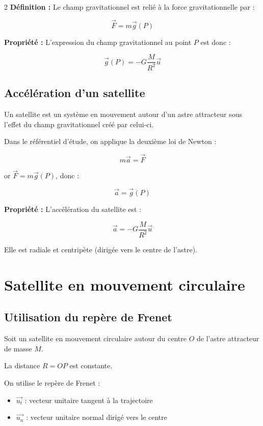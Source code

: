 \documentclass[11pt,a4paper]{article}
\newcommand{\defi}{\textbf{Définition :} }
\newcommand{\prop}{\textbf{Propriété :} }
\begin{document}
\begin{paracol}{2}
\defi Le champ gravitationnel est relié à la force gravitationnelle par :

\[
\vec{F}=m\vec{g}(P)
\]


\prop L'expression du champ gravitationnel au point $P$ est donc :

\[
\boxed{\vec{g}(P)=-G\frac{M}{R^2}\vec{u}}
\]

\subsection{Accélération d'un satellite}

Un satellite est un système en mouvement autour d'un astre attracteur sous l'effet du champ gravitationnel créé par celui-ci.

Dans le référentiel d'étude, on applique la deuxième loi de Newton :

\[
m\vec{a}=\vec{F}
\]

or $\vec{F}=m\vec{g}(P)$, donc :

\[
\vec{a}=\vec{g}(P)
\]

\prop L'accélération du satellite est :

\[
\boxed{\vec{a}=-G\frac{M}{R^2}\vec{u}}
\]

Elle est radiale et centripète (dirigée vers le centre de l'astre).


\switchcolumn
\setcounter{section}{1}

\section{Satellite en mouvement circulaire}

\subsection{Utilisation du repère de Frenet}

Soit un satellite en mouvement circulaire autour du centre $O$ de l'astre attracteur de masse $M$.

La distance $R=OP$ est constante.

On utilise le repère de Frenet :

\begin{itemize}
\item $\vec{u_t}$ : vecteur unitaire tangent à la trajectoire
\item $\vec{u_n}$ : vecteur unitaire normal dirigé vers le centre
\end{itemize}


\end{paracol}
\end{document}
